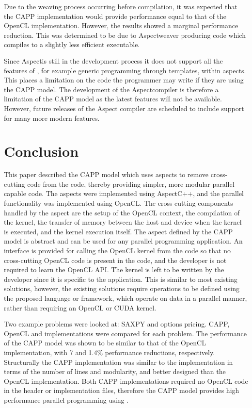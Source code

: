 \documentclass{sig-alternate-05-2015}
\begin{document}
Due to the weaving process occurring before compilation, it was expected that
the CAPP implementation would provide performance equal to that of the
OpenCL implementation. However, the results showed a marginal performance
reduction. This was determined to be due to Aspect\CPP weaver producing code
which compiles to a slightly less efficient executable. 

Since Aspect\CPP is still in the development process it does not support all 
the features of \CPP, for example generic programming through templates, within
aspects. 
This places a limitation on the \CPP code  the programmer may write if they 
are using the CAPP model. The development of the Aspect\CPP compiler 
is therefore a limitation of the CAPP model as the latest \CPP 
features will not be available. However, future releases of the Aspect\CPP
compiler are scheduled to include support for many more modern \CPP features.

\section{Conclusion}\label{sec:conclusion}

This paper described the CAPP model which uses aspects to remove
cross-cutting code from the \CPP code, thereby providing simpler, more modular
parallel capable \CPP code. The aspects were implemented using AspectC++,
and the parallel functionality was implemented using OpenCL. The cross-cutting 
components handled by the aspect are the setup of the OpenCL
context, the compilation of the kernel, the transfer of memory between the 
host and device when the kernel is executed, and the kernel execution itself. 
The aspect defined by the CAPP model is abstract and can be used for 
any parallel programming application. An interface is provided for calling the 
OpenCL kernel from the \CPP code so that no cross-cutting OpenCL code is present in
the \CPP code, and the developer is not required to learn the OpenCL API. The
kernel is left to be written by the developer since it is specific to the
application. This is similar to most existing solutions, however, the existing
solutions require operations to be defined using the proposed language or
framework, which operate on data in a parallel manner, rather than requiring an
OpenCL or CUDA kernel.

Two example problems were looked at: SAXPY and options pricing. CAPP, OpenCL 
and \CPP implementations were compared for each problem. The performance of the 
CAPP model was shown to be similar to that of the OpenCL
implementation, with 7 and 1.4\% performance reductions, respectively. Structurally 
the CAPP implementation was similar 
to the \CPP  implementation in terms of the number of lines and modularity, and
better designed than the OpenCL implementation. Both CAPP implementations
required no OpenCL code in the \CPP header or implementation files, therefore the
CAPP model provides high performance parallel programming using \CPP.
\end{document}
